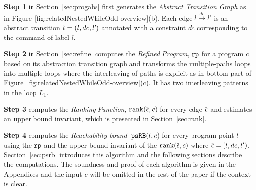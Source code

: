 
\textbf{Step 1}
in Section~\ref{sec:progabs} first 
generates the \emph{Abstract Transition Graph} as in Figure~\ref{fig:relatedNestedWhileOdd-overview}(b).
Each edge $l \xrightarrow{dc} l'$ is an abstract transition $\hat{\mathtt{\epsilon}{}} = (l, dc, l')$ annotated with a constraint $dc$ corresponding to the command of label $l$.

\textbf{Step 2} in Section~\ref{sec:refine}
computes the \emph{Refined Program}, $\mathtt{rp}$ for a program $c$ based on 
its abstraction transition graph and transforms the multiple-paths loops
into multiple loops where
the interleaving of paths is explicit as in bottom part of Figure~\ref{fig:relatedNestedWhileOdd-overview}(c).
It has two interleaving patterns in the loop $L_1$.

\textbf{Step 3} computes the \emph{Ranking Function}, $\mathtt{rank}(\hat{\mathtt{\epsilon}{}}, c)$ 
for every edge $\hat{\mathtt{\epsilon}{}}$ 
and estimates an upper bound invariant, which is presented in Section~\ref{sec:rank}.

\textbf{Step 4}
computes the \emph{Reachability-bound}, $\mathtt{psRB}(l, c)$ for every program point $l$ using the $\mathtt{rp}$ and the upper bound invariant of the $\mathtt{rank}(\hat{\mathtt{\epsilon}{}}, c)$ where $\hat{\mathtt{\epsilon}{}} = (l,dc,l')$.
Section~\ref{sec:psrb} introduces this algorithm and the following sections describe the computations. 
The soundness and proof of each algorithm is given in the Appendices and the input $c$ will be omitted in the rest of the paper if the context is clear.

